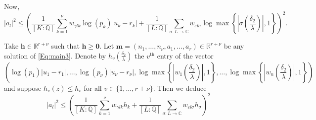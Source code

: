 Now, 
\begin{equation}\label{def:bepsbound}
|a_l|^2 \leq \left( \frac{1}{[K:\mathbb{Q}]}\sum_{k = 1}^{\nu} w_{\gamma l k}\log(p_k)|u_k - r_k| + \frac{1}{[L:\mathbb{Q}]}\sum_{\sigma :L \to \mathbb{C}} w_{\varepsilon l \sigma}\log \max \left\{ \left|\sigma\left(\frac{\delta_2}{\lambda}\right)\right|, 1\right\} \right)^2.
\end{equation}


Take $\mathbf{h}\in\mathbb{R}^{r+\nu}$ such that $\mathbf{h}\geq \mathbf{0}$. Let $\mathbf{m} = (n_1, \dots, n_{\nu}, a_1, \dots, a_r) \in \mathbb{R}^{r + \nu}$ be any solution of \eqref{Eq:main3}. Denote by $h_{v}\left(\frac{\delta_2}{\lambda}\right)$ the $v^{\text{th}}$ entry of the vector
\[\left(\log(p_1)|u_1 - r_1|, \dots, \log(p_{\nu})|u_{\nu} - r_{\nu}|, \log \max \left\{ \left|w_1\left(\frac{\delta_2}{\lambda}\right)\right|, 1\right\}, \dots, \log \max \left\{ \left|w_n\left(\frac{\delta_2}{\lambda}\right)\right|, 1\right\} \right)\] 
and suppose $h_v(z)\leq h_v$ for all $v\in \{1, \dots, r+\nu\}$. Then we deduce
\[|a_l|^2 \leq \left( \frac{1}{[K:\mathbb{Q}]}\sum_{k = 1}^{\nu} w_{\gamma l k}h_k + \frac{1}{[L:\mathbb{Q}]}\sum_{\sigma:L\to \mathbb{C}} w_{\varepsilon l \sigma}h_{\sigma}\right)^2 \]

